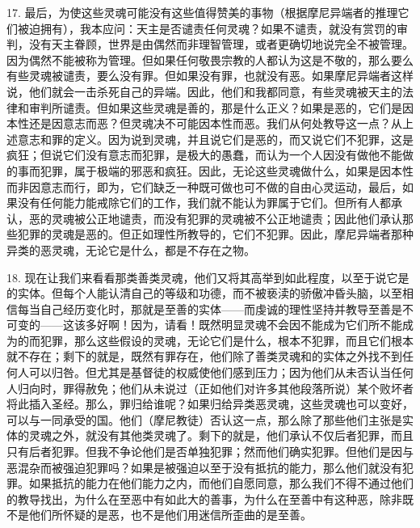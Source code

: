 17. 最后，为使这些灵魂可能没有这些值得赞美的事物（根据摩尼异端者的推理它们被迫拥有），我本应问：天主是否谴责任何灵魂？如果不谴责，就没有赏罚的审判，没有天主眷顾，世界是由偶然而非理智管理，或者更确切地说完全不被管理。因为偶然不能被称为管理。但如果任何敬畏宗教的人都认为这是不敬的，那么要么有些灵魂被谴责，要么没有罪。但如果没有罪，也就没有恶。如果摩尼异端者这样说，他们就会一击杀死自己的异端。因此，他们和我都同意，有些灵魂被天主的法律和审判所谴责。但如果这些灵魂是善的，那是什么正义？如果是恶的，它们是因本性还是因意志而恶？但灵魂决不可能因本性而恶。我们从何处教导这一点？从上述意志和罪的定义。因为说到灵魂，并且说它们是恶的，而又说它们不犯罪，这是疯狂；但说它们没有意志而犯罪，是极大的愚蠢，而认为一个人因没有做他不能做的事而犯罪，属于极端的邪恶和疯狂。因此，无论这些灵魂做什么，如果是因本性而非因意志而行，即为，它们缺乏一种既可做也可不做的自由心灵运动，最后，如果没有任何能力能戒除它们的工作，我们就不能认为罪属于它们。但所有人都承认，恶的灵魂被公正地谴责，而没有犯罪的灵魂被不公正地谴责；因此他们承认那些犯罪的灵魂是恶的。但正如理性所教导的，它们不犯罪。因此，摩尼异端者那种异类的恶灵魂，无论它是什么，都是不存在之物。\par

18. 现在让我们来看看那类善类灵魂，他们又将其高举到如此程度，以至于说它是的实体。但每个人能认清自己的等级和功德，而不被亵渎的骄傲冲昏头脑，以至相信每当自己经历变化时，那就是至善的实体——而虔诚的理性坚持并教导至善是不可变的——这该多好啊！因为，请看！既然明显灵魂不会因不能成为它们所不能成为的而犯罪，那么这些假设的灵魂，无论它们是什么，根本不犯罪，而且它们根本就不存在；剩下的就是，既然有罪存在，他们除了善类灵魂和的实体之外找不到任何人可以归咎。但尤其是基督徒的权威使他们感到压力；因为他们从未否认当任何人归向时，罪得赦免；他们从未说过（正如他们对许多其他段落所说）某个败坏者将此插入圣经。那么，罪归给谁呢？如果归给异类恶灵魂，这些灵魂也可以变好，可以与一同承受的国。他们（摩尼教徒）否认这一点，那么除了那些他们主张是实体的灵魂之外，就没有其他类灵魂了。剩下的就是，他们承认不仅后者犯罪，而且只有后者犯罪。但我不争论他们是否单独犯罪；然而他们确实犯罪。但他们是因与恶混杂而被强迫犯罪吗？如果是被强迫以至于没有抵抗的能力，那么他们就没有犯罪。如果抵抗的能力在他们能力之内，而他们自愿同意，那么我们不得不通过他们的教导找出，为什么在至恶中有如此大的善事，为什么在至善中有这种恶，除非既不是他们所怀疑的是恶，也不是他们用迷信所歪曲的是至善。\par


